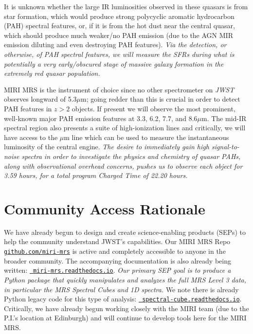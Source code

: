\smallskip \smallskip
\noindent
It is unknown whether the large IR luminosities observed in these
quasars is from star formation, which would produce strong polycyclic
aromatic hydrocarbon (PAH) spectral features, or, if it is from the hot
dust near the central quasar, which should produce much weaker/no PAH
emission (due to the AGN MIR emission diluting and even destroying PAH
features). {\it Via the detection, or otherwise, of PAH spectral
features, we will measure the SFRs during what is potentially a very
early/obscured stage of massive galaxy formation in the extremely red
quasar population.}

\smallskip \smallskip
\noindent
MIRI MRS is the instrument of choice since no other spectrometer on
{\it JWST} observes longward of 5.3$\mu$m; going redder than this is
crucial in order to detect PAH features in $z>2$ objects.  If present
we will observe the most prominent, well-known major PAH emission
features at 3.3, 6.2, 7.7, and 8.6$\mu$m. The mid-IR spectral region
also presents a suite of high-ionization lines and critically, we will
have access to the $\mu$m line which can be used to measure
the instantaneous luminosity of the central engine.  {\it The desire
to immediately gain high signal-to-noise spectra in order to
investigate the physics and chemistry of quasar PAHs, along with
observational overhead concerns, pushes us to observe each object for
3.59 hours, for a total program Charged Time of 22.20 hours.}


\section*{Community Access Rationale}
\vspace{-6pt}
\noindent
We have already begun to design and create science-enabling products
(SEPs) to help the community understand JWST's capabilities.  Our MIRI
MRS Repo \href{https://github.com/miri-mrs}{{\tt github.com/miri-mrs}}
is active and completely accessible to anyone in the broader
community.  The accompanying documentation is also already being
written: \href{http://miri-mrs.readthedocs.io/}{{\tt
miri-mrs.readthedocs.io}}.  {\it Our primary SEP goal is to produce a
Python package that quickly manipulates and analyzes the full MRS
Level 3 data, in particular the MRS Spectral Cubes and 1D spectra. }
We note there is already Python legacy code for this type of analysis:
\href{https://spectral-cube.readthedocs.io/}{\tt
spectral-cube.readthedocs.io}. Critically, we have
already begun working closely with the MIRI team (due to the P.I.'s
location at Edinburgh) and will continue to develop tools here for the
MIRI MRS.


